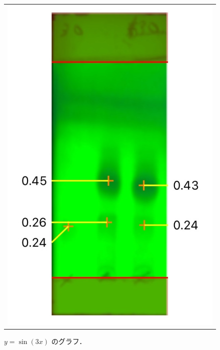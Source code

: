 \documentclass[a4paper,papersize,dvipdfmx]{jsarticle}
\begin{document}
\begin{figure}[htpb]
\begin{tabular}{c}
 
 
      \begin{minipage}{0.47\hsize}
        \centering
          \includegraphics[keepaspectratio, scale=0.60, angle=0]
                          {imgs4/tlc1.JPG}
                          \caption{$y=\sin(3x)$ のグラフ．}
                          \label{fig:sin_3x}
      \end{minipage}
 
 
      \begin{minipage}{0.06\hsize}
        \hspace{2mm}
      \end{minipage}
 

\end{tabular}
\end{figure}
\end{document}
